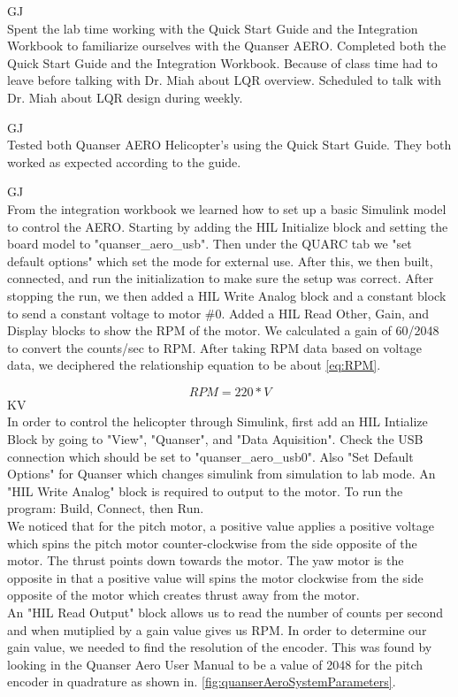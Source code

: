 \documentclass[fontsize=11pt, %
                             paper=letter, %
                             openany, %
                             captions=tableheading,
                             index=totoc,
                             hyperref]{labbook}
\begin{document}
\begin{addmargin}[0cm]{0cm}


GJ\\
Spent the lab time working with the Quick Start Guide and the Integration Workbook to familiarize ourselves with the Quanser AERO.  Completed both the Quick Start Guide and the Integration Workbook.  Because of class time had to leave before talking with Dr. Miah about LQR overview. Scheduled to talk with Dr. Miah about LQR design during weekly. 

GJ\\
Tested both Quanser AERO Helicopter's using the Quick Start Guide.  They both worked as expected according to the guide.

GJ\\
From the integration workbook we learned how to set up a basic Simulink model to control the AERO.  Starting by adding the HIL Initialize block and setting the board model to "quanser\_aero\_usb".  Then under the QUARC tab we "set default options" which set the mode for external use.  After this, we then built, connected, and run the initialization to make sure the setup was correct.  After stopping the run, we then added a HIL Write Analog block and a constant block to send a constant voltage to motor \#0. Added a HIL Read Other, Gain, and Display blocks to show the RPM of the motor.  We calculated a gain of 60/2048 to convert the counts/sec to RPM.  After taking RPM data based on voltage data, we deciphered the relationship equation to be about \autoref{eq:RPM}.

\begin{equation}
\label{eq:RPM}
RPM = 220*V
\end{equation}
\newpage
KV\\
In order to control the helicopter through Simulink, first add an HIL Intialize Block by going to "View", "Quanser", and "Data Aquisition".  Check the USB connection which should be set to "quanser\_aero\_usb0".  Also "Set Default Options" for Quanser which changes simulink from simulation to lab mode.
An "HIL Write Analog" block is required to output to the motor.  To run the program: Build, Connect, then Run.
\\We noticed that for the pitch motor, a positive value applies a positive voltage which spins the pitch motor counter-clockwise from the side opposite of the motor.  The thrust points down towards the motor.  The yaw motor is the opposite in that a positive value will spins the motor clockwise from the side opposite of the motor which creates thrust away from the motor.
\\An "HIL Read Output" block allows us to read the number of counts per second and when mutiplied by a gain value gives us RPM.  In order to determine our gain value, we needed to find the resolution of the encoder.  This was found by looking in the Quanser Aero User Manual \cite{quanserAeroUserManual} to be a value of 2048 for the pitch encoder in quadrature as shown in. \autoref{fig:quanserAeroSystemParameters}.


\end{addmargin}
\end{document}
